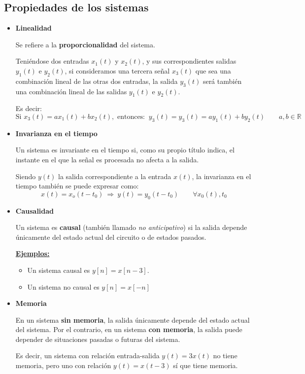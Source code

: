 \documentclass[a4paper]{book}
\begin{document}
\subsection{Propiedades de los sistemas}
\begin{itemize}
\item \textbf{Linealidad}

Se refiere a la \textbf{proporcionalidad} del sistema.

Teniéndose dos entradas $x_1(t)$ y $x_2(t)$, y sus correspondientes salidas $y_1(t)$ e $y_2(t)$, si consideramos una tercera señal $x_3(t)$ que sea una combinación lineal de las otras dos entradas, la salida $y_3(t)$ será también una combinación lineal de las salidas $y_1(t)$ e $y_2(t)$.

Es decir: \[\text{Si } x_3(t) = ax_1(t) + bx_2(t) , \text{ entonces: }\ y_3(t) = y_3(t) = ay_1(t) + by_2(t) \qquad a,b\in \mathbb{R}\]

\item \textbf{Invarianza en el tiempo}

Un sistema es invariante en el tiempo si, como su propio título indica, el instante en el que la señal es procesada no afecta a la salida.

Siendo $y(t)$ la salida correspondiente a la entrada $x(t)$, la invarianza en el tiempo también se puede expresar como: \[x(t)= x_o(t-t_0) \ \Longrightarrow \ y(t)=y_0(t-t_0) \qquad \forall x_0(t), t_0\]


\item \textbf{Causalidad}

Un sistema es \textbf{causal} (también llamado \textsl{no anticipativo}) si la salida depende únicamente del estado actual del circuito o de estados pasados.

\underline{\textbf{Ejemplos:}}
\begin{itemize}
\item Un sistema causal es $y[n] = x[n-3]$.
\item Un sistema no causal es $y[n] = x[-n]$
\end{itemize}

\item \textbf{Memoria}

En un sistema \textbf{sin memoria}, la salida únicamente depende del estado actual del sistema. Por el contrario, en un sistema \textbf{con memoria}, la salida puede depender de situaciones pasadas o futuras del sistema.

Es decir, un sistema con relación entrada-salida $y(t) = 3x(t)$ no tiene memoria, pero uno con relación $y(t) = x(t-3)$ sí que tiene memoria.


\end{itemize}
\end{document}
